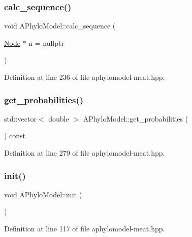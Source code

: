 \subsubsection{\texorpdfstring{calc\+\_\+sequence()}{calc\_sequence()}}
{\footnotesize\ttfamily void A\+Phylo\+Model\+::calc\+\_\+sequence (\begin{DoxyParamCaption}\item[{\hyperlink{class_node}{Node} $\ast$}]{n = {\ttfamily nullptr} }\end{DoxyParamCaption})}



Definition at line 236 of file aphylomodel-\/meat.\+hpp.

\mbox{\label{class_a_phylo_model_a3368d03919454f68f0cb5bd888f983a1}} 
\subsubsection{\texorpdfstring{get\+\_\+probabilities()}{get\_probabilities()}}
{\footnotesize\ttfamily std\+::vector$<$ double $>$ A\+Phylo\+Model\+::get\+\_\+probabilities (\begin{DoxyParamCaption}{ }\end{DoxyParamCaption}) const}



Definition at line 279 of file aphylomodel-\/meat.\+hpp.

\mbox{\label{class_a_phylo_model_a45a7af583f9619bce5d88b15303a73e6}} 
\subsubsection{\texorpdfstring{init()}{init()}}
{\footnotesize\ttfamily void A\+Phylo\+Model\+::init (\begin{DoxyParamCaption}{ }\end{DoxyParamCaption})}



Definition at line 117 of file aphylomodel-\/meat.\+hpp.

\mbox{\label{class_a_phylo_model_a66fced3b89fe385862318621855fa605}} 

